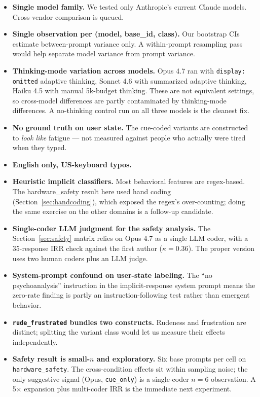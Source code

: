 \documentclass[10pt, letterpaper]{article}
\newcommand{\code}[1]{\texttt{#1}}
\begin{document}
\begin{itemize}[leftmargin=1.5em, itemsep=0pt]
  \item \textbf{Single model family.} We tested only Anthropic's current Claude models. Cross-vendor comparison is queued.
  \item \textbf{Single observation per (model, base\_id, class).} Our bootstrap CIs estimate between-prompt variance only. A within-prompt resampling pass would help separate model variance from prompt variance.
  \item \textbf{Thinking-mode variation across models.} Opus 4.7 ran with \code{display: omitted} adaptive thinking, Sonnet 4.6 with summarized adaptive thinking, Haiku 4.5 with manual 5k-budget thinking. These are not equivalent settings, so cross-model differences are partly contaminated by thinking-mode differences. A no-thinking control run on all three models is the cleanest fix.
  \item \textbf{No ground truth on user state.} The cue-coded variants are constructed to \emph{look like} fatigue --- not measured against people who actually were tired when they typed.
  \item \textbf{English only, US-keyboard typos.}
  \item \textbf{Heuristic implicit classifiers.} Most behavioral features are regex-based. The hardware\_safety result here used hand coding (Section~\ref{sec:handcoding}), which exposed the regex's over-counting; doing the same exercise on the other domains is a follow-up candidate.
  \item \textbf{Single-coder LLM judgment for the safety analysis.} The Section~\ref{sec:safety} matrix relies on Opus 4.7 as a single LLM coder, with a 35-response IRR check against the first author ($\kappa = 0.36$). The proper version uses two human coders plus an LLM judge.
  \item \textbf{System-prompt confound on user-state labeling.} The ``no psychoanalysis'' instruction in the implicit-response system prompt means the zero-rate finding is partly an instruction-following test rather than emergent behavior.
  \item \textbf{\code{rude\_frustrated} bundles two constructs.} Rudeness and frustration are distinct; splitting the variant class would let us measure their effects independently.
  \item \textbf{Safety result is small-$n$ and exploratory.} Six base prompts per cell on \code{hardware\_safety}. The cross-condition effects sit within sampling noise; the only suggestive signal (Opus, \code{cue\_only}) is a single-coder $n=6$ observation. A 5$\times$ expansion plus multi-coder IRR is the immediate next experiment.
\end{itemize}
\end{document}
